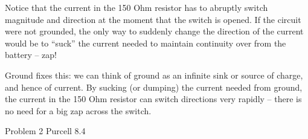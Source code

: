 \documentclass[makesolutionspdf]{esg8022pset}
\begin{document}
\begin{solution}
Notice that the current in the 150 Ohm resistor has to abruptly switch
magnitude and direction at the moment that the switch is opened. If
the circuit were not grounded, the only way to suddenly change the
direction of the current would be to ``suck'' the current needed to
maintain continuity over from the battery -- zap!

Ground fixes this: we can think of ground as an infinite sink or
source of charge, and hence of current. By sucking (or dumping) the
current needed from ground, the current in the 150 Ohm resistor can
switch directions very rapidly -- there is no need for a big zap
across the switch.


\end{solution}

\begin{problem}{Problem 2 Purcell 8.4}
\end{problem}
\end{document}
